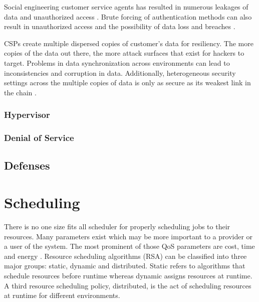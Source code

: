 \documentclass[12pt]{article}
\begin{document}
Social engineering customer service agents has resulted in numerous leakages of data and unauthorized access \cite{amazonse,icloudse}. Brute forcing of authentication methods can also result in unauthorized access and the possibility of data loss and breaches \cite{alertlogicsecurity}.

CSPs create multiple dispersed copies of customer's data for resiliency. The more copies of the data out there, the more attack surfaces that exist for hackers to target. Problems in data synchronization across environments can lead to inconsistencies and corruption in data. Additionally, heterogeneous security settings across the multiple copies of data is only as secure as its weakest link in the chain \cite{liu2015survey}.


\subsubsection{Hypervisor}





\subsubsection{Denial of Service}






\subsection{Defenses}



\cite{liu2015survey,kazim2015survey,kalpana2015brief}



\section{Scheduling} \label{sec:scheduling}

There is no one size fits all scheduler for properly scheduling jobs to their resources. Many parameters exist which may be more important to a provider or a user of the system. The most prominent of those QoS parameters are cost, time and energy \cite{Singh2016}. Resource scheduling algorithms (RSA) can be classified into three major groups: static, dynamic and distributed. Static refers to algorithms that schedule resources before runtime whereas dynamic assigns resources at runtime. A third resource scheduling policy, distributed, is the act of scheduling resources at runtime for different environments.
\end{document}
